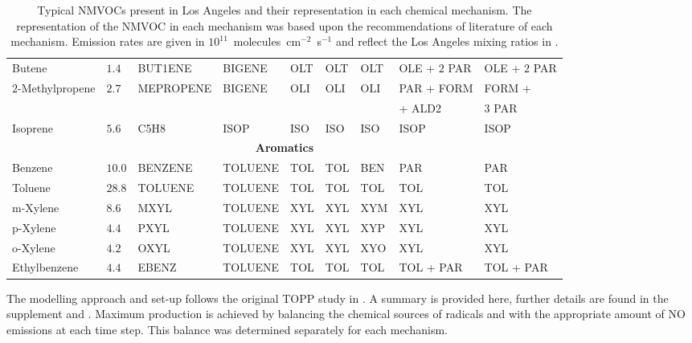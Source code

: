 \begin{sidewaystable}
\begin{tabular}{lllllllll}
        Butene & $1.4$ & BUT1ENE & BIGENE & OLT & OLT & OLT & OLE + $2$ PAR & OLE + $2$ PAR \\ 
        \multirow{2}{*}{$2$-Methylpropene} & \multirow{2}{*}{$2.7$} & \multirow{2}{*}{MEPROPENE} & \multirow{2}{*}{BIGENE} & \multirow{2}{*}{OLI} & \multirow{2}{*}{OLI} & \multirow{2}{*}{OLI} & PAR + FORM & FORM + \\ & & & & & & & \hspace{3mm}+ ALD2 & \hspace{3mm}$3$ PAR \\
        Isoprene & $5.6$ & C5H8 & ISOP & ISO & ISO & ISO & ISOP & ISOP \\ \hline
        \multicolumn{9}{c}{\textbf{Aromatics}} \\ \hline 
        Benzene & $10.0$ & BENZENE & TOLUENE & TOL & TOL & BEN & PAR & PAR \\
        Toluene & $28.8$ & TOLUENE & TOLUENE & TOL & TOL & TOL & TOL & TOL \\
        m-Xylene & $8.6$ & MXYL & TOLUENE & XYL & XYL & XYM & XYL & XYL \\
        p-Xylene & $4.4$ & PXYL & TOLUENE & XYL & XYL & XYP & XYL & XYL \\
        o-Xylene & $4.2$ & OXYL & TOLUENE & XYL & XYL & XYO & XYL & XYL \\
        Ethylbenzene & $4.4$ & EBENZ & TOLUENE & TOL & TOL & TOL & TOL + PAR & TOL + PAR \\ \hline \hline
    \end{tabular}
    \vspace{1mm}
    \caption{Typical NMVOCs present in Los Angeles and their representation in each chemical mechanism. The representation of the NMVOC in each mechanism was based upon the recommendations of literature of each mechanism. Emission rates are given in \mbox{$10^{11}$ molecules cm$^{-2}$ s$^{-1}$} and reflect the Los Angeles mixing ratios in \citet{Baker:2008}.}
    \vspace{-4mm}
    \label{t:initial_conditions}
\end{sidewaystable}

The modelling approach and set-up follows the original TOPP study in \citet{Butler:2011}.
A summary is provided here, further details are found in the supplement and \citet{Butler:2011}. 
Maximum  production is achieved by balancing the chemical sources of radicals and  with the appropriate amount of NO emissions at each time step.
This balance was determined separately for each mechanism.

